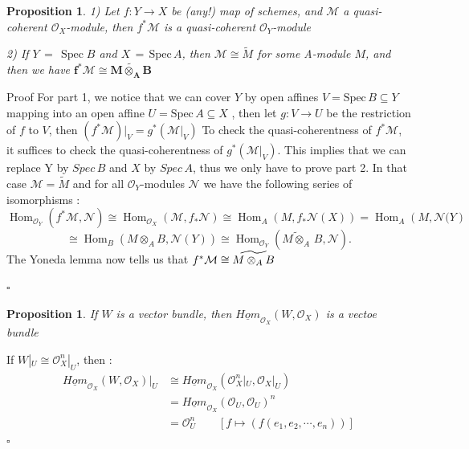 \documentclass{article}
\newtheorem{proposition}[theorem]{Proposition}
\newenvironment{Proof}{{\noindent \indent \it Proof:\quad}}{\hfill $\square$\par}
\begin{document}
\begin{proposition} 
1) Let $f:Y\to X$ be (any!) map of schemes, and $\mathcal M$ a quasi-coherent ${\mathcal{O}}_{X}$-module, then $f^{\ast}\mathcal M$ is a quasi-coherent ${\mathcal{O}}_{Y}$-module

2) If $Y\,=\,\operatorname{Spec}B$ and $X\,=\,{\mathrm{Spec}}\,A$, then $\mathcal M\cong{\widetilde{{M}}}$ for some A-module $M$, and then we have $\bm{f^{\ast}\mathcal{M}\cong \widetilde{M\otimes_{A}B}}$ 
\end{proposition}
\begin{Proof}
    Proof For part 1,  we notice that we can cover $Y$ by open affines $V={\mathrm{Spec}}\,B\subseteq Y$ mapping into an open affine $U={\mathrm{Spec}}\,A\subseteq X$ , then let $g:V\to U$ be the restriction of $f$ to $V$, then $(f^{\ast}\mathcal{M})|_{V}=g^{*}(\mathcal{M}|_{V})$ To check the quasi-coherentness of $f^{\ast}{\mathcal{M}}$, it suffices to check the quasi-coherentness of $g^{\ast}({\mathcal{M}}|_{V})$. This implies that we can replace Y by $Spec\,B$ and $X$ by $Spec\,A$,  thus we only have to prove part 2. 
In that case $\mathcal M=\widetilde M$ and for all ${\mathcal{O}}_{Y}$-modules $\mathcal N$ we have the following series of isomorphisms :
$$
\operatorname{Hom}_{\mathcal O_Y}(f^\ast \mathcal M,{\mathcal{N}})
\cong
\operatorname{Hom}_{\mathcal O_X}(\mathcal M,f_\ast{\mathcal{N}})
\cong
\operatorname{Hom}_{A}(M,f_\ast{\mathcal{N}(X)})
=
\operatorname{Hom}_{A}(M,{\mathcal{N}(Y})
$$
$$
\cong\operatorname{Hom}_{B}(M\otimes_{A}B,{\mathcal{N}}(Y))\cong\operatorname{Hom}_{\mathcal O_Y}({\widetilde{M\otimes_{A}}}\,B,{\mathcal{N}}). 
$$
The Yoneda lemma now tells us that $f^{\ast}{\cal M}\cong \widetilde{M\otimes_{A}B}$

\end{Proof}

\begin{proposition}
    If $W$ is a vector bundle, then $\underline{Hom}_{\mathcal O_X}(W,\mathcal O_X)$ is a vectoe bundle
\end{proposition}
\begin{Proof}
    If $W|_U\cong \mathcal O_X^n|_U$, then :
\begin{align*}
\label{sup}
\underline{Hom}_{\mathcal O_X}(W,\mathcal O_X)|_U
&\cong \underline{Hom}_{\mathcal O_X}(\mathcal O_X^n|_U,\mathcal O_X|_U)\\
&=\underline{Hom}_{\mathcal O_X}(\mathcal O_U,\mathcal O_U)^n\\
&=\mathcal O_U^n\quad\quad
[f\mapsto (f(e_1,e_2,\cdots,e_n))]
 \end{align*}
\end{Proof}
\end{document}
